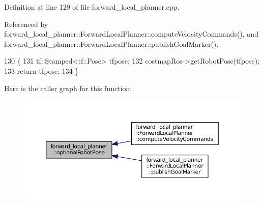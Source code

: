 Definition at line 129 of file forward\+\_\+local\+\_\+planner.\+cpp.



Referenced by forward\+\_\+local\+\_\+planner\+::\+Forward\+Local\+Planner\+::compute\+Velocity\+Commands(), and forward\+\_\+local\+\_\+planner\+::\+Forward\+Local\+Planner\+::publish\+Goal\+Marker().


\begin{DoxyCode}
130 \{
131     tf::Stamped<tf::Pose> tfpose;
132     costmapRos->getRobotPose(tfpose);
133     \textcolor{keywordflow}{return} tfpose;
134 \}
\end{DoxyCode}


Here is the caller graph for this function\+:
\nopagebreak
\begin{figure}[H]
\begin{center}
\leavevmode
\includegraphics[width=350pt]{namespaceforward__local__planner_a0f2a0ed20a39ca20d24b83a5877bbb4d_icgraph}
\end{center}
\end{figure}


